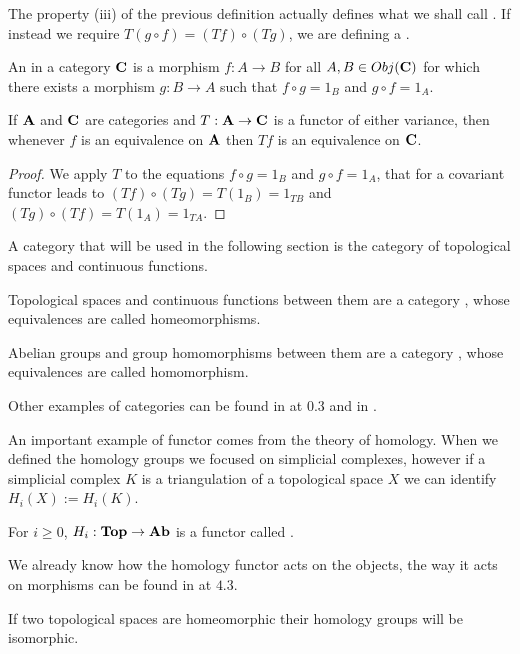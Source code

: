 \documentclass[../1.tex]{subfiles}
\begin{document}
    The property (iii) of the previous definition actually defines what we shall call .
    If instead we require $T(g \circ f) = (Tf) \circ (Tg)$, we are defining a .

    \begin{defn}
        An  in a category $\textbf{C}$ is a morphism $f : A \to B$ for all $A,B \in Obj(\textbf{C})$ for which there exists a morphism $g : B \to A$ such that
        $ f \circ g = 1_B$ and $ g \circ f = 1_A$.
    \end{defn}

    \begin{thm}
        If $\textbf{A}$ and $\textbf{C}$ are categories and $T : \textbf{A} \to \textbf{C}$ is a functor of either variance, then whenever $f$ is 
        an equivalence on $\textbf{A}$ then $Tf$ is an equivalence on $\textbf{C}$.
    \end{thm}
    \begin{proof}
        We apply $T$ to the equations $ f \circ g = 1_B$ and $ g \circ f = 1_A$, that for a covariant functor leads to 
        $(Tf) \circ (Tg) = T(1_B) = 1_{TB}$ and $(Tg) \circ (Tf) = T(1_A) = 1_{TA}$.
    \end{proof}

    A category that will be used in the following section is the category of topological spaces and continuous functions.

    \begin{prop}
        Topological spaces and continuous functions between them are a category , whose equivalences are called homeomorphisms.
    \end{prop}

    \begin{prop}
        Abelian groups and group homomorphisms between them are a category , whose equivalences are called homomorphism.
    \end{prop}

    Other examples of categories can be found in \cite{rotman} at 0.3 and in \cite{mclane}.

    An important example of functor comes from the theory of homology.
    When we defined the homology groups we focused on simplicial complexes, however if a simplicial complex $K$ is a triangulation of a topological space $X$
    we can identify $H_i(X) := H_i(K)$.

    \begin{thm}
        For $i \geq 0$, $H_i : \textbf{Top} \to \textbf{Ab}$ is a functor called .
    \end{thm}

    We already know how the homology functor acts on the objects, the way it acts on morphisms can be found in 
    \cite{rotman} at $4.3$. 
    \begin{rem}
        If two topological spaces are homeomorphic
        their homology groups will be isomorphic.
    \end{rem}
    
\end{document}

